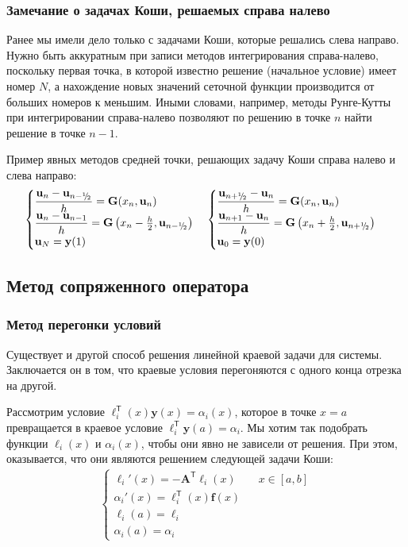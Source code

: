 \documentclass[professionalfonts,compress,unicode,aspectratio=169]{beamer}
\newcommand{\cutefrac}[2]{{}^{#1}\mkern-5mu/{\!}_#2}
\newcommand{\half}{{\cutefrac{1}{2}}}
\begin{document}
\begin{frame}\frametitle{Замечание о задачах Коши, решаемых справа налево}
	Ранее мы имели дело только с задачами Коши, которые решались слева направо.
	Нужно быть аккуратным при записи методов интегрирования справа-налево,
	поскольку первая точка, в которой известно решение (начальное условие)
	имеет номер $N$, а нахождение новых значений сеточной функции производится
	от больших номеров к меньшим. Иными словами, например, методы Рунге-Кутты
	при интегрировании справа-налево позволяют по решению в точке $n$ найти
	решение в точке $n-1$. 

	Пример явных методов средней точки, решающих задачу Коши справа налево и слева направо:
	\[
	\begin{cases}
	\dfrac{\mathbf{u}_n - \mathbf{u}_{n - \half}}{h} = \mathbf{G}(x_n,
	\mathbf{u}_{n})\\
	\dfrac{\mathbf{u}_n - \mathbf{u}_{n - 1}}{h} = 
	\mathbf{G}\left(x_{n}-\frac{h}{2}, \mathbf{u}_{n-\half}\right)\\
	\mathbf{u}_N = \mathbf{y}(1)
	\end{cases}
	\begin{cases}
	\dfrac{\mathbf{u}_{n+\half} - \mathbf{u}_n}{h} = \mathbf{G}(x_n,
	\mathbf{u}_{n})\\
	\dfrac{\mathbf{u}_{n+1} - \mathbf{u}_n}{h} = 
	\mathbf{G}\left(x_{n}+\frac{h}{2}, \mathbf{u}_{n+\half}\right)\\
	\mathbf{u}_0 = \mathbf{y}(0)
	\end{cases}
	\]
\end{frame}

\subsection{Метод сопряженного оператора}
\begin{frame}\frametitle{Метод перегонки условий}
	Существует и другой способ решения линейной краевой задачи для системы.
	Заключается он в том, что краевые условия перегоняются с одного конца
	отрезка на другой. 

	Рассмотрим условие $\boldsymbol{\ell}_i^\mathsf{T}(x) \mathbf{y}(x) =
	\alpha_i(x)$, которое в точке $x = a$ превращается в краевое условие
	$\boldsymbol{\ell}_i^\mathsf{T} \mathbf{y}(a) = \alpha_i$. Мы хотим так
	подобрать функции $\boldsymbol{\ell}_i(x)$ и $\alpha_i(x)$,
	чтобы они явно не зависели от решения. При этом, оказывается, что они
	являются решением следующей задачи Коши:
	\begin{gather*}
	\begin{cases}
	\boldsymbol{\ell}_i'(x) = - \mathbf{A}^\mathsf{T}
	\boldsymbol{\ell}_i(x)
	\qquad x \in [a,b]
	\\
	\alpha_i'(x) = \boldsymbol{\ell}^{\mathsf{T}}_i(x)
	\mathbf{f}(x)\\
	\boldsymbol{\ell}_i(a) = \boldsymbol{\ell}_i\\
	\alpha_i(a) = \alpha_i
	\end{cases}
	\end{gather*}
\end{frame}
\end{document}
